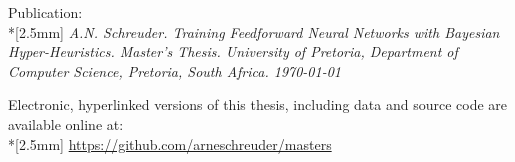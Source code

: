 \pagestyle{empty}
\vspace*{\fill}
\small

\noindent
\textsf{Publication:}\\*[2.5mm]
\textsf{
    \fontsize{9}{10pt}
    \selectfont
    \textit{
        A.N. Schreuder. Training Feedforward Neural Networks with Bayesian
        Hyper-Heuristics. Master's Thesis. University of Pretoria,
        Department of Computer Science, Pretoria, South Africa.
        \monthyeardate\today
    }
}
\vspace{1cm}

\noindent
\textsf{Electronic, hyperlinked versions of this thesis, including
data and source code are available online at:}\\*[2.5mm]
\textsf{
    \fontsize{9}{10pt}
    \selectfont
    \url{https://github.com/arneschreuder/masters}
}
\newpage
